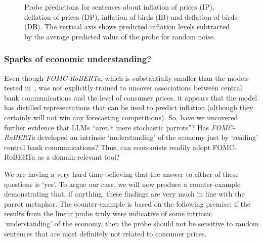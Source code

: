 \begin{figure}


\caption{\label{fig-attack}Probe predictions for sentences about inflation of prices (IP), deflation of prices (DP), inflation of birds (IB) and deflation of birds (DB). The vertical axis shows predicted inflation levels subtracted by the average predicted value of the probe for random noise.}

\end{figure}%

\subsubsection{Sparks of economic understanding?}\label{stochastic-parrots-after-all}
Even though \emph{FOMC-RoBERTa}, which is substantially smaller than the models tested in~\citet{gurnee2023languagev2}, was not explicitly trained to uncover associations between central bank communications and the level of consumer prices, it appears that the model has distilled representations that can be used to predict inflation (although they certainly will not win any forecasting competitions). So, have we uncovered further evidence that LLMs ``aren't mere stochastic
parrots''? Has \emph{FOMC-RoBERTa} developed an intrinsic `understanding'
of the economy just by `reading' central bank communications? Thus, can economists readily adopt FOMC-RoBERTa as a domain-relevant tool?

We are having a very hard time believing that the answer to either of these questions is `yes'. To argue our case, we will now produce a counter-example demonstrating that, if anything, these findings are very much in line with the parrot metaphor. The counter-example is based on the following premise: if the results from the linear probe truly were indicative of some intrinsic `understanding' of the economy, then the probe should not be sensitive to random sentences that are most definitely not related to consumer prices.

